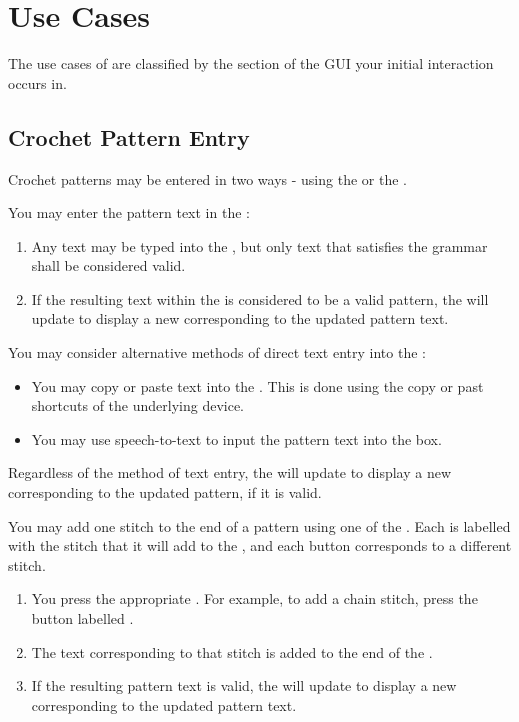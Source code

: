 \documentclass[main.tex]{subfiles}
\begin{document}
\chapter{Use Cases}\label{chp:use}

The use cases of \CC{} are classified by the section of the GUI your initial interaction occurs in.

\section{Crochet Pattern Entry}

Crochet patterns may be entered in two ways - using the \PTI{} or the \ASB.

You may enter the pattern text in the \PTI:
\begin{enumerate}
\item Any text may be typed into the \PTI, but only text that satisfies the grammar shall be considered valid.
\item If the resulting text within the \PTI{} is considered to be a valid pattern, the \CRW{} will update to display a new \RM{} corresponding to the updated pattern text. 
\end{enumerate}

You may consider alternative methods of direct text entry into the \PTI:
\begin{itemize}
\item You may copy or paste text into the \PTI. This is done using the copy or past shortcuts of the underlying device.
\item You may use speech-to-text to input the pattern text into the \PTI{} box.
\end{itemize}
Regardless of the method of text entry, the \CRW{} will update to display a new \RM{} corresponding to the updated pattern, if it is valid.


You may add one stitch to the end of a pattern using one of the \ASBs. Each \ASB{} is labelled with the stitch that it will add to the \RM, and each button corresponds to a different stitch. 

\begin{enumerate}
\item You press the appropriate \ASB. For example, to add a chain stitch, press the button labelled .
\item The text corresponding to that stitch is added to the end of the \PTI.
\item If the resulting pattern text is valid, the \CRW{} will update to display a new \RM{} corresponding to the updated pattern text. 
\end{enumerate}
\end{document}
